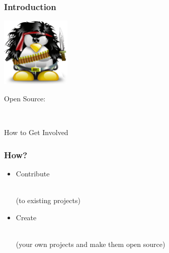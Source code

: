 \documentclass{beamer}
\begin{document}
\begin{frame}
  \frametitle{Introduction}
  \begin{center}
    \includegraphics[width=0.25\textwidth]{../img/tux-rambo}   

    \vspace{2em}

    \begin{Huge}Open Source:\end{Huge} \\ \begin{LARGE}How to Get Involved\end{LARGE}
  \end{center}
\end{frame}

\begin{frame}
  \frametitle{How?}
  \begin{itemize}
    \setlength{\itemsep}{2em}
  \item \begin{LARGE} \textcolor<2>{beamer@myblue}{Contribute} \end{LARGE} \\ \textcolor<2>{beamer@myblue}{(to existing projects)} \\
  \item \begin{LARGE} \textcolor<2>{beamer@mygrey}{Create} \end{LARGE} \\ \textcolor<2>{beamer@mygrey}{(your own projects and make them open source)}
  \end{itemize}
\end{frame}
\end{document}
